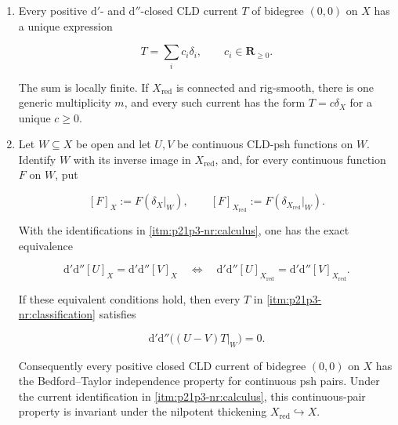 \begin{proposition}
\begin{enumerate}
\begin{equation}
\label{eq:p21p3-nr-fundamental-cycle}
        \delta_X=\sum_i m_i\delta_i,
        \qquad
        \iota_*\delta_{X_{\mathrm{red}}}=\sum_i\delta_i.
\end{equation}

Both sums are locally finite.  In particular,
\(\delta_X=\iota_*\delta_{X_{\mathrm{red}}}\) if and only if \(X\) is
generically reduced along every \(X_i\).

\item\label{itm:p21p3-nr:classification}
Every positive \(\mathrm d'\)- and \(\mathrm d''\)-closed CLD current \(T\)
of bidegree \((0,0)\) on \(X\) has a unique expression

\begin{equation}
\label{eq:p21p3-nr-classification}
                     T=\sum_i c_i\delta_i,
                     \qquad c_i\in\mathbf R_{\geq0}.
\end{equation}

The sum is locally finite.  If \(X_{\mathrm{red}}\) is connected and
rig-smooth, there is one generic multiplicity \(m\), and every such current
has the form \(T=c\delta_X\) for a unique \(c\geq0\).

\item\label{itm:p21p3-nr:bedford-taylor}
Let \(W\subseteq X\) be open and let \(U,V\) be continuous CLD-psh
functions on \(W\).  Identify \(W\) with its inverse image in
\(X_{\mathrm{red}}\), and, for every continuous function \(F\) on \(W\),
put

\[
 [F]_X:=F(\delta_X|_W),\qquad
 [F]_{X_{\mathrm{red}}}:=F(\delta_{X_{\mathrm{red}}}|_W).
\]

With the identifications in \cref{itm:p21p3-nr:calculus}, one has the
exact equivalence

\begin{equation}
\label{eq:p21p3-nr-curvature-equivalence}
 \mathrm d'\mathrm d''[U]_X=\mathrm d'\mathrm d''[V]_X
 \quad\Longleftrightarrow\quad
 \mathrm d'\mathrm d''[U]_{X_{\mathrm{red}}}
   =\mathrm d'\mathrm d''[V]_{X_{\mathrm{red}}}.
\end{equation}

If these equivalent conditions hold, then every \(T\) in
\cref{itm:p21p3-nr:classification} satisfies

\begin{equation}
\label{eq:p21p3-nr-bt-conclusion}
       \mathrm d'\mathrm d''\bigl((U-V)T|_W\bigr)=0.
\end{equation}

Consequently every positive closed CLD current of bidegree \((0,0)\) on
\(X\) has the Bedford--Taylor independence property for continuous psh
pairs.  Under the current identification in
\cref{itm:p21p3-nr:calculus}, this continuous-pair property is invariant
under the nilpotent thickening
\(X_{\mathrm{red}}\hookrightarrow X\).
\end{enumerate}
\end{proposition}

